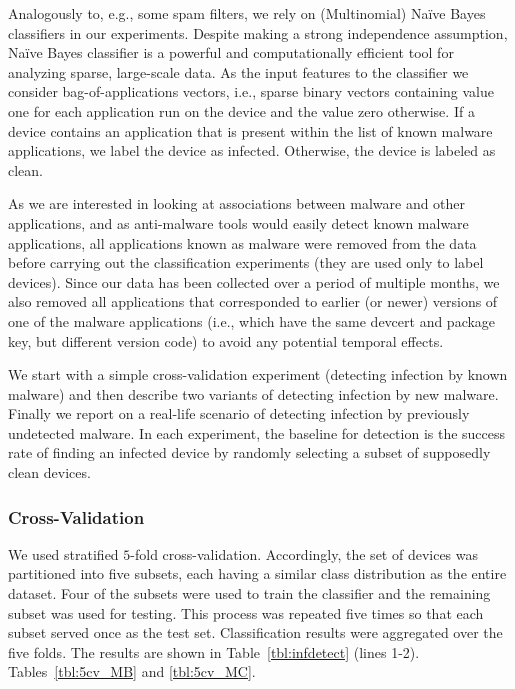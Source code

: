 Analogously to, e.g., some spam filters, we rely on (Multinomial)
Na{\"i}ve Bayes classifiers in our experiments. Despite making a strong
independence assumption, Na{\"i}ve Bayes classifier is a powerful and
computationally efficient tool for analyzing sparse, large-scale
data. As the input features to the classifier we consider
bag-of-applications vectors, i.e., sparse binary vectors containing
value one for each application run on the device and the value zero
otherwise.  If a device contains an application that is present within
the list of known malware applications, we label the device as
infected. Otherwise, the device is labeled as clean.

As we are interested in looking at associations between malware and
other applications, and as anti-malware tools would easily detect
known malware applications, all applications known as malware were
removed from the data before carrying out the classification
experiments (they are used only to label devices). Since our data has
been collected over a period of multiple months, we also removed all
applications that corresponded to earlier (or newer) versions of one
of the malware applications (i.e., which have the same devcert and
package key, but different version code) to avoid any potential
temporal effects.

We start with a simple cross-validation experiment (detecting
infection by known malware) and then describe two variants of
detecting infection by new malware.  Finally we report
on a real-life scenario of detecting infection by previously
undetected malware.  In each experiment, the baseline for detection
is the success rate of finding an infected device by randomly
selecting a subset of supposedly clean devices.




\subsubsection{Cross-Validation}
\label{subsubsec:predictions:applications:cross}

We used stratified $5$-fold cross-validation. Accordingly, the set of devices was
partitioned into five subsets, each having a similar class distribution as
the entire dataset. Four of the subsets were used to train the
classifier and the remaining subset was used for testing. This process
was repeated five times so that each subset served once as the test
set.  Classification results were aggregated over the five folds. The
results are shown in 
\ifwww
Table~\ref{tbl:infdetect} (lines 1-2).
\else
Tables~\ref{tbl:5cv_MB} and
\ref{tbl:5cv_MC}.
\fi

